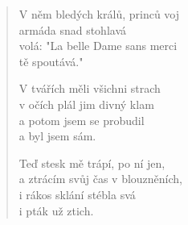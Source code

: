 \begin{multicols}{2}
\begin{verse}
		V něm bledých králů, princů voj  \\
		armáda snad stohlavá  \\
		volá: "La belle Dame sans merci  \\
		tě spoutává."
		
		V tvářích měli všichni strach  \\
		v očích plál jim divný klam  \\
		a potom jsem se probudil  \\
		a byl jsem sám.
		
		Teď stesk mě trápí, po ní jen,  \\
		a ztrácím svůj čas v blouzněních, \\ 
		i rákos sklání stébla svá  \\
		i pták už ztich.
		
	\end{verse}
\end{multicols}